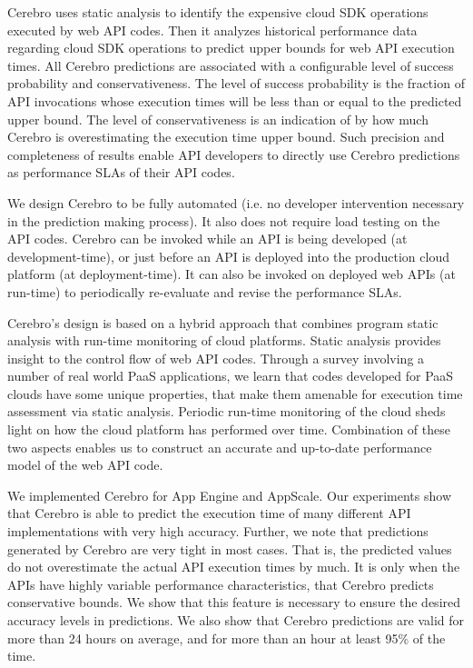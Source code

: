 Cerebro uses static analysis to identify the expensive cloud SDK operations
executed by web API codes. Then it analyzes historical performance data regarding cloud SDK
operations to predict upper bounds for web API execution times. All Cerebro predictions
are associated with a configurable level of success probability and conservativeness. The level of 
success probability is the fraction of API invocations whose execution times will be less than or equal to the
predicted upper bound. The level of conservativeness is an indication of by how much Cerebro
is overestimating the execution time upper bound. Such precision and completeness of results
enable API developers to directly use Cerebro predictions as performance SLAs of their
API codes.

We design Cerebro to be fully automated (i.e. no developer intervention necessary in
the prediction making process). It also does not require load testing on the API codes. Cerebro can be
invoked while an API is being developed (at development-time), or just before an API is deployed
into the production cloud platform (at deployment-time). It can also be invoked on deployed
web APIs (at run-time) to periodically re-evaluate and revise the performance SLAs.

Cerebro's design is based on a hybrid approach that combines program static analysis with run-time
monitoring of cloud platforms. Static analysis provides insight to the control flow of web
API codes. Through a survey involving a number
of real world PaaS applications, we learn that codes developed for PaaS clouds have
some unique properties, that make them amenable for execution time assessment via static 
analysis. Periodic run-time monitoring of the cloud sheds light on how
the cloud platform has performed over time. Combination of these two aspects enables
us to construct an accurate and up-to-date performance model of the web API code. 


We implemented Cerebro for App Engine and AppScale.
Our experiments show that Cerebro is able to predict the execution time
of many different API implementations with very high accuracy. 
Further, we note that
predictions generated by Cerebro are very tight in most cases. That is, the predicted values do not
overestimate the actual API execution times by much. It is only when the APIs have highly variable 
performance characteristics, that Cerebro predicts conservative bounds. We show that this feature 
is necessary to ensure the desired accuracy levels in predictions.
We also show that Cerebro predictions
are valid for more than 24 hours on average, and for more than an hour at least 95\% of the time.

